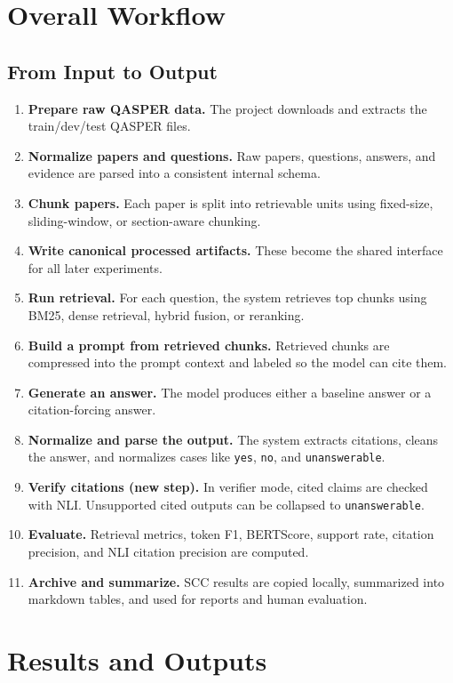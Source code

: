 \documentclass[11pt]{article}
\begin{document}
\section{Overall Workflow}
\subsection{From Input to Output}
\begin{enumerate}
  \item \textbf{Prepare raw QASPER data.} The project downloads and extracts the train/dev/test QASPER files.
  \item \textbf{Normalize papers and questions.} Raw papers, questions, answers, and evidence are parsed into a consistent internal schema.
  \item \textbf{Chunk papers.} Each paper is split into retrievable units using fixed-size, sliding-window, or section-aware chunking.
  \item \textbf{Write canonical processed artifacts.} These become the shared interface for all later experiments.
  \item \textbf{Run retrieval.} For each question, the system retrieves top chunks using BM25, dense retrieval, hybrid fusion, or reranking.
  \item \textbf{Build a prompt from retrieved chunks.} Retrieved chunks are compressed into the prompt context and labeled so the model can cite them.
  \item \textbf{Generate an answer.} The model produces either a baseline answer or a citation-forcing answer.
  \item \textbf{Normalize and parse the output.} The system extracts citations, cleans the answer, and normalizes cases like \texttt{yes}, \texttt{no}, and \texttt{unanswerable}.
  \item \textbf{Verify citations (new step).} In verifier mode, cited claims are checked with NLI. Unsupported cited outputs can be collapsed to \texttt{unanswerable}.
  \item \textbf{Evaluate.} Retrieval metrics, token F1, BERTScore, support rate, citation precision, and NLI citation precision are computed.
  \item \textbf{Archive and summarize.} SCC results are copied locally, summarized into markdown tables, and used for reports and human evaluation.
\end{enumerate}

\section{Results and Outputs}
\end{document}
